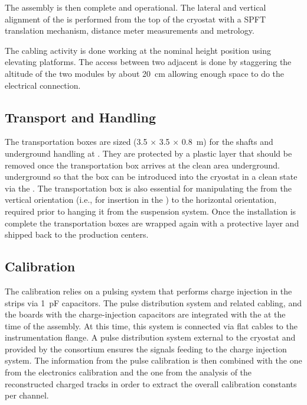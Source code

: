 The assembly is then complete and operational.
The lateral and vertical alignment of the  is performed from the top of the cryostat with a SPFT translation mechanism, distance meter measurements and metrology.

The cabling activity is done  working at the nominal height position using elevating platforms. The access between two adjacent  is done by staggering the altitude of the two modules by about \SI{20}{cm} allowing enough space to do the electrical connection. 


\subsection{Transport and Handling}
\label{sec:fddp-crp-install-transport}

The transportation boxes are sized (\num{3.5} $\times$ \num{3.5} $\times$ \SI{0.8}{m}) for the shafts and underground handling at \surf{}.
They are protected by a plastic layer that should be removed once the transportation box arrives at the clean area underground.
underground so that the box can be introduced into the cryostat in a clean state via the . The transportation box is also essential for manipulating the  from the vertical orientation (i.e., for insertion in the ) to the horizontal orientation, required %
 prior to hanging it from the suspension system. Once the installation is complete the transportation boxes are wrapped again with a protective layer and shipped back to the production centers. 

\subsection{Calibration}
\label{sec:fddp-crp-install-calib}

The  calibration relies on a pulsing system that performs charge injection in the strips via \SI{1}{pF} capacitors. The pulse distribution system and related cabling, and the boards with the charge-injection capacitors are integrated  with the  at the time of the  assembly. At this time, this system is connected via flat cables to the instrumentation flange. A pulse distribution system external to the cryostat and  provided by the  consortium ensures the signals feeding to the charge injection system. 
The information from the pulse calibration is then combined
with the one from the  electronics calibration and the one from the analysis of the reconstructed charged tracks in order to extract the overall calibration constants per channel.

